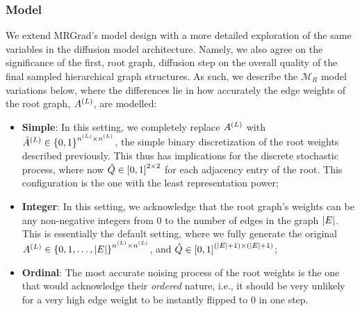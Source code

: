 \subsubsection{Model}
We extend MRGrad's model design with a more detailed exploration of the same variables in the diffusion model architecture. Namely, we also agree on the significance of the first, root graph, diffusion step on the overall quality of the final sampled hierarchical graph structures. As such, we describe the $\mathcal{M}_R$ model variations below, where the differences lie in how accurately the edge weights of the root graph, $A^{\mathopen{}\left(L\right)}$, are modelled:
\begin{itemize}
    \item \textbf{Simple}: In this setting, we completely replace $A^{\mathopen{}\left(L\right)}$ with $\bar{A}^{\mathopen{}\left(L\right)} \in \mathopen{}\left\{0,1\right\}^{n^{\mathopen{}\left(L\right)} \times n^{\mathopen{}\left(L\right)}}$, the simple binary discretization of the root weights described previously. This thus has implications for the discrete stochastic process, where now $\hat{Q}\in\mathopen{}\left[0,1\right]^{2 \times 2}$ for each adjacency entry of the root. This configuration is the one with the least representation power;
    \item \textbf{Integer}: In this setting, we acknowledge that the root graph's weights can be any non-negative integers from 0 to the number of edges in the graph $\mathopen{}\left|E\right|$. This is essentially the default setting, where we fully generate the original $A^{\mathopen{}\left(L\right)} \in \mathopen{}\left\{0,1,\dots,\mathopen{}\left|E\right|\right\}^{n^{\mathopen{}\left(L\right)} \times n^{\mathopen{}\left(L\right)}}$, and $\hat{Q}\in\mathopen{}\left[0,1\right]^{\mathopen{}\left(\mathopen{}\left|E\right|+1\right) \times \mathopen{}\left(\mathopen{}\left|E\right|+1\right)}$;
    \item \textbf{Ordinal}: The most accurate noising process of the root weights is the one that would acknowledge their \emph{ordered} nature, i.e., it should be very unlikely for a very high edge weight to be instantly flipped to 0 in one step. 
    

\end{itemize}
